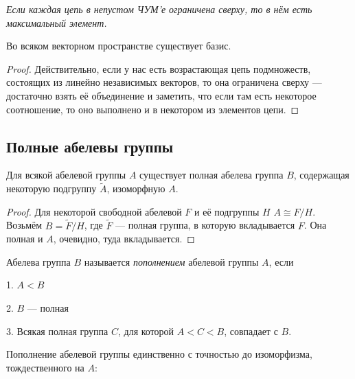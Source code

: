 \documentclass[10pt,a4paper]{article}
\begin{document}
\vskip 2pt {\sl Если
каждая цепь в непустом ЧУМ'е ограничена сверху, то в нём есть
максимальный элемент.}

\begin{theorem}Во всяком векторном пространстве существует
базис.
\end{theorem}

\begin{proof} Действительно, если у нас есть возрастающая цепь
подмножеств, состоящих из линейно независимых векторов, то она
ограничена сверху --- достаточно взять её объединение и заметить,
что если там есть некоторое соотношение, то оно выполнено и в
некотором из элементов цепи.
\end{proof}

\subsection{Полные абелевы группы}

\begin{theorem}Для всякой
абелевой группы $A$ существует полная абелева группа $B$,
содержащая некоторую подгруппу $\widetilde{A}$, изоморфную $A$.
\end{theorem}

\begin{proof} Для некоторой свободной абелевой $F$ и её подгруппы $H$
$A\cong F/H$. Возьмём $B=\widetilde{F}/H$, где $\widetilde{F}$
--- полная группа, в которую вкладывается $F$. Она полная и $A$,
очевидно, туда вкладывается.\end{proof}

Абелева группа $B$ называется {\em пополнением} абелевой группы $A$, если
\par 1. $A<B$
\par 2. $B$ --- полная
\par 3. Всякая полная группа $C$, для которой $A<C<B$, совпадает с $B$.

\begin{theorem}
Пополнение абелевой группы единственно с точностью до изоморфизма,
тождественного на $A$:
\begin{figure}[h]
\hfil{}\hfil
\end{figure}\label{ab gr comp}
\end{theorem}
\end{document}
